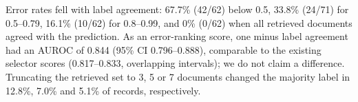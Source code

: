 Error rates fell with label agreement: 67.7\% (42/62) below 0.5, 33.8\% (24/71) for 0.5--0.79, 16.1\% (10/62) for 0.8--0.99, and 0\% (0/62) when all retrieved documents agreed with the prediction. As an error-ranking score, one minus label agreement had an AUROC of 0.844 (95\% CI 0.796--0.888), comparable to the existing selector scores (0.817--0.833, overlapping intervals); we do not claim a difference. Truncating the retrieved set to 3, 5 or 7 documents changed the majority label in 12.8\%, 7.0\% and 5.1\% of records, respectively.
